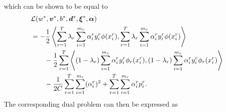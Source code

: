 which can be shown to be equal to
\begin{equation}\nonumber
    \begin{aligned}
        &\mathcal{L}({{w}}^*, {\bm{v}}^*, {b}^*, {\bm{d}}^*, {\bm{\xi}}^*, \bm{\alpha}) \\
        &= - \frac{1}{2} \bm{\left\langle}  \sum_{r= 1}^T  \lambda_r \sum_{i=1}^{m_r} {\alpha_i^r}  y_i^r \phi({x}_i^r) ,  \sum_{r= 1}^T \lambda_r \sum_{i=1}^{m_r} {\alpha_i^r}  y_i^r \phi({x}_i^r)  \bm{\right\rangle} \\
        &\qquad - \frac{1}{2} \sum_{r= 1}^T { \bm{\left\langle} (1-\lambda_r) \sum_{i=1}^{m_r} {\alpha_i^r}  y_i^r \phi_r({x}_i^r) , (1-\lambda_r) \sum_{i=1}^{m_r} {\alpha_i^r}  y_i^r \phi_r({x}_i^r)  \bm{\right\rangle}} \\
        &\qquad - \frac{1}{2C} \sum_{r=1}^T \sum_{i=1}^{m_r} (\alpha_i^r)^2  +  \sum_{r= 1}^T \sum_{i=1}^{m_r} \alpha_i^r  p_{i}^r .
    \end{aligned}
\end{equation}
The corresponding dual problem can then be expressed as
